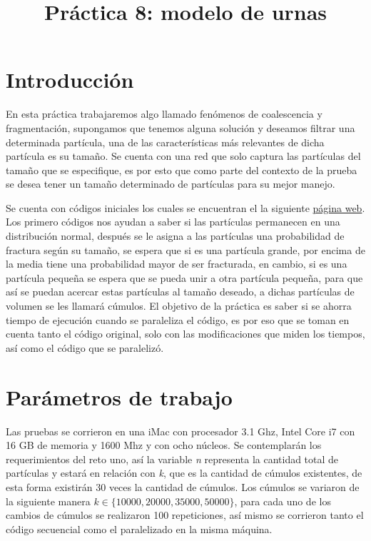 \documentclass[a4paper]{article}
\title{Práctica 8: modelo de urnas}
\begin{document}
\maketitle

\section{Introducci\'on}
En esta práctica trabajaremos algo llamado fenómenos de coalescencia y fragmentación, supongamos que tenemos alguna solución y deseamos filtrar una determinada partícula, una de las características más relevantes de dicha partícula es su tamaño. Se cuenta con una red que solo captura las partículas del tamaño que se especifique, es por esto que como parte del contexto de la prueba se desea tener un tamaño determinado de partículas para su mejor manejo. 

Se cuenta con códigos iniciales los cuales se encuentran el la siguiente \href{http://elisa.dyndns-web.com/teaching/comp/par/p8.html}{página web}. Los primero códigos nos ayudan a saber si las partículas permanecen en una distribución normal, después se le asigna a las partículas una probabilidad de fractura según su tamaño, se espera que si es una partícula grande, por encima de la media tiene una probabilidad mayor de ser fracturada, en cambio, si es una partícula pequeña se espera que se pueda unir a otra partícula pequeña, para que así se puedan acercar estas partículas al tamaño deseado, a dichas partículas de volumen se les llamará cúmulos. El objetivo de la práctica es saber si se ahorra tiempo de ejecución cuando se paraleliza el código, es por eso que se toman en cuenta tanto el código original, solo con las modificaciones que miden los tiempos, así como el código que se paralelizó.

\section{Par\'ametros de trabajo}
Las pruebas se corrieron en una iMac con procesador 3.1 Ghz, Intel Core i7 con 16 GB de memoria y 1600 Mhz y con ocho núcleos. Se contemplarán los requerimientos del reto uno, así la variable \textit{n} representa la cantidad total de partículas y estará en relación con \textit{k}, que es la cantidad de cúmulos existentes, de esta forma existirán $30$ veces la cantidad de cúmulos. Los cúmulos se variaron de la siguiente manera $k\in\{10000,20000,35000,50000\}$, para cada uno de los cambios de cúmulos se realizaron 100 repeticiones, así mismo se corrieron tanto el código secuencial como el paralelizado en la misma máquina.
\end{document}
